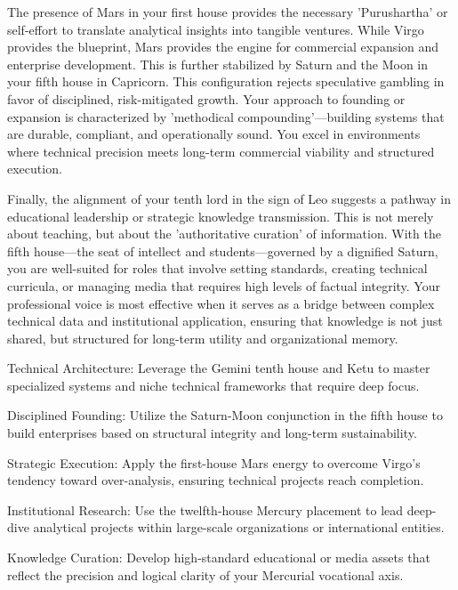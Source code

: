 {\fontsize{9}{13}\selectfont The presence of Mars in your first house provides the necessary 'Purushartha' or self-effort to translate analytical insights into tangible ventures. While Virgo provides the blueprint, Mars provides the engine for commercial expansion and enterprise development. This is further stabilized by Saturn and the Moon in your fifth house in Capricorn. This configuration rejects speculative gambling in favor of disciplined, risk-mitigated growth. Your approach to founding or expansion is characterized by 'methodical compounding'---building systems that are durable, compliant, and operationally sound. You excel in environments where technical precision meets long-term commercial viability and structured execution.}\par\vspace{1.8mm}

{\fontsize{9}{13}\selectfont Finally, the alignment of your tenth lord in the sign of Leo suggests a pathway in educational leadership or strategic knowledge transmission. This is not merely about teaching, but about the 'authoritative curation' of information. With the fifth house---the seat of intellect and students---governed by a dignified Saturn, you are well-suited for roles that involve setting standards, creating technical curricula, or managing media that requires high levels of factual integrity. Your professional voice is most effective when it serves as a bridge between complex technical data and institutional application, ensuring that knowledge is not just shared, but structured for long-term utility and organizational memory.}\par\vspace{1.8mm}

\begin{diamondlist}
  \item {\fontsize{8.5}{12}\selectfont Technical Architecture: Leverage the Gemini tenth house and Ketu to master specialized systems and niche technical frameworks that require deep focus.}
  \item {\fontsize{8.5}{12}\selectfont Disciplined Founding: Utilize the Saturn-Moon conjunction in the fifth house to build enterprises based on structural integrity and long-term sustainability.}
  \item {\fontsize{8.5}{12}\selectfont Strategic Execution: Apply the first-house Mars energy to overcome Virgo's tendency toward over-analysis, ensuring technical projects reach completion.}
  \item {\fontsize{8.5}{12}\selectfont Institutional Research: Use the twelfth-house Mercury placement to lead deep-dive analytical projects within large-scale organizations or international entities.}
  \item {\fontsize{8.5}{12}\selectfont Knowledge Curation: Develop high-standard educational or media assets that reflect the precision and logical clarity of your Mercurial vocational axis.}
\end{diamondlist}

